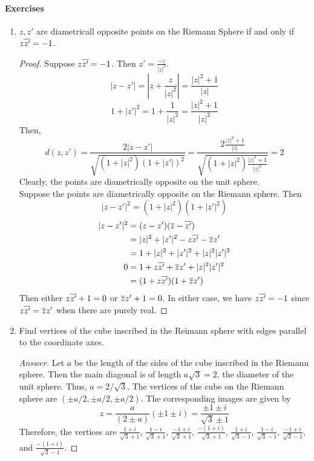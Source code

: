 \paragraph{Exercises}
\begin{enumerate}
	\item $z,z'$ are diametricall opposite points on the Riemann Sphere if and only if $z\overline{z'} = -1$.
	\begin{proof}
		Suppose $z\overline{z'} = -1$.
		Then $z' = \frac{-z}{|z|^2}$.
		\[ |z-z'| = \left| z + \frac{z}{|z|^2} \right| = \frac{|z|^2+1}{|z|} \]
		\[ 1+|z'|^2 = 1+ \frac{1}{|z|^2} = \frac{|z|^2+1}{|z|^2}  \]
		Then,
		\[ d(z,z') = \frac{2|z-z'|}{\sqrt{(1+|z|^2)(1+|{z'}|)^2}} = \frac{2\frac{|z|^2+1}{|z|}}{\sqrt{(1+|z|^2)\frac{|z|^2+1}{|z|^2}}} = 2 \]
		Clearly, the points are diametrically opposite on the unit sphere.\\

		Suppose the points are diametrically opposite on the Riemann sphere.
		Then
		\[ |{z-z'}|^2 = (1+|z|^2)(1+|{z'}|^2) \]
		\begin{align*}
			|{z-z'}| ^2
			& =  (z-z')(\overline{z}-\overline{z'}) \\
			& = |z|^2+|{z'}|^2 - z\overline{z'} - \overline{z}z'  \\
			& = 1+|z|^2+|{z'}|^2+|z|^2|{z'}|^2 \\
			0 & = 1+z\overline{z'}+\overline{z}z'+|z|^2|{z'}|^2 \\
			& = (1+z\overline{z'})(1+\overline{z}z')
		\end{align*}
		Then either $z\overline{z'}+1 = 0$ or $\overline{z}z'+1=0$.
		In either case, we have $z\overline{z'} = -1$ since $z\overline{z'} = \overline{z}z'$ when there are purely real.
	\end{proof}

	\item Find vertices of the cube inscribed in the Reimann sphere with edges parallel to the coordinate axes.
	\begin{proof}[Answer]
		Let $a$ be the length of the sides of the cube inscribed in the Riemann sphere.
		Then the main diagonal is of length $a\sqrt{3} = 2$, the diameter of the unit sphere.
		Thus, $a = 2/\sqrt{3}$.
		The vertices of the cube on the Riemann sphere are $(\pm a/2,\pm a/2,\pm a/2)$.
		The corresponding images are given by 
		\[ z = \frac{a}{(2 \pm a)}(\pm 1 \pm i) = \frac{\pm 1 \pm i}{\sqrt{3} \pm 1} \]
		Therefore, the vertices are $\frac{1+i}{\sqrt{3} + 1}$, $\frac{1-i}{\sqrt{3} + 1}$, $\frac{-1+i}{\sqrt{3} + 1}$, $\frac{-(1+i)}{\sqrt{3} + 1}$, $\frac{1+i}{\sqrt{3} - 1}$, $\frac{1-i}{\sqrt{3} - 1}$, $\frac{-1+i}{\sqrt{3} - 1}$, and $\frac{-(1+i)}{\sqrt{3} - 1}$.


\end{proof}
\end{enumerate}
